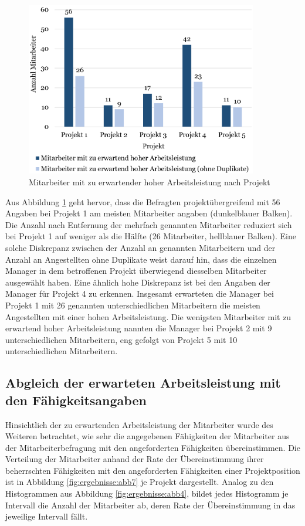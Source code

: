 \begin{figure}
    \centering
	\includegraphics[width=0.9\textwidth]{gfx/verteilung-m-prod.png}
	\caption[Mitarbeiter mit zu erwartender hoher Arbeitsleistung nach Projekt]{Mitarbeiter mit zu erwartender hoher Arbeitsleistung nach Projekt}
	\label{fig:ergebnisse:abb5}
\end{figure}

Aus Abbildung \ref{fig:ergebnisse:abb5} geht hervor, dass die Befragten projektübergreifend mit 56 Angaben bei Projekt 1 am meisten Mitarbeiter angaben (dunkelblauer Balken).
Die Anzahl nach Entfernung der mehrfach genannten Mitarbeiter reduziert sich bei Projekt 1 auf weniger als die Hälfte (26 Mitarbeiter, hellblauer Balken).
Eine solche Diskrepanz zwischen der Anzahl an genannten Mitarbeitern und der Anzahl an Angestellten ohne Duplikate weist darauf hin, dass die einzelnen Manager in dem betroffenen Projekt überwiegend diesselben Mitarbeiter ausgewählt haben.
Eine ähnlich hohe Diskrepanz ist bei den Angaben der Manager für Projekt 4 zu erkennen.
Insgesamt erwarteten die Manager bei Projekt 1 mit 26 genannten unterschiedlichen Mitarbeitern die meisten Angestellten mit einer hohen Arbeitsleistung.
Die wenigsten Mitarbeiter mit zu erwartend hoher Arbeitsleistung nannten die Manager bei Projekt 2 mit 9 unterschiedlichen Mitarbeitern, eng gefolgt von Projekt 5 mit 10 unterschiedlichen Mitarbeitern.

\subsection{Abgleich der erwarteten Arbeitsleistung mit den Fähigkeitsangaben}
Hinsichtlich der zu erwartenden Arbeitsleistung der Mitarbeiter wurde des Weiteren betrachtet, wie sehr die angegebenen Fähigkeiten der Mitarbeiter aus der Mitarbeiterbefragung mit den angeforderten Fähigkeiten übereinstimmen.
Die Verteilung der Mitarbeiter anhand der Rate der Übereinstimmung ihrer beherrschten Fähigkeiten mit den angeforderten Fähigkeiten einer Projektposition ist in Abbildung \ref{fig:ergebnisse:abb7} je Projekt dargestellt.
Analog zu den Histogrammen aus Abbildung \ref{fig:ergebnisse:abb4}, bildet jedes Histogramm je Intervall die Anzahl der Mitarbeiter ab, deren Rate der Übereinstimmung in das jeweilige Intervall fällt.

